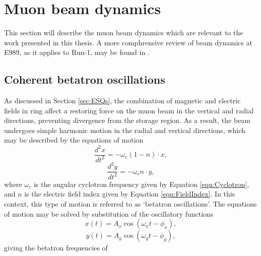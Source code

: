 \section{Muon beam dynamics}\label{sec:BeamDynamics}

This section will describe the muon beam dynamics which are relevant to the work presented in this thesis. A more comphrensive review of beam dynamics at E989, as it applies to Run-1, may be found in \cite{BeamDynamics}.

\subsection{Coherent betatron oscillations}\label{subsec:CBO}

As discussed in Section \ref{sec:ESQs}, the combination of magnetic and electric fields in ring affect a restoring force on the muon beam in the vertical and radial directions, preventing divergence from the storage region. As a result, the beam undergoes simple harmonic motion in the radial and vertical directions, which may be described by the equations of motion 
%
\begin{equation}
  \frac{d^{2}x}{dt^{2}} = -\omega_{c}(1-n)\cdot x,
  \label{eqn:EOM_BOx}
\end{equation}
%
%
\begin{equation}
  \frac{d^{2}y}{dt^{2}} = -\omega_{c}n\cdot y,
  \label{eqn:EOM_BOy}
\end{equation}
%
where $\omega_{c}$ is the angular cyclotron frequency given by Equation \ref{eqn:Cyclotron}, and $n$ is the electric field index given by Equation \ref{eqn:FieldIndex}. In this context, this type of motion is referred to as `betatron oscillations'. The equations of motion may be solved by substitution of the oscillatory functions
%
\begin{equation}
  x(t) = A_{x}\cos(\omega_{x}t-\phi_{x}),
  \label{eqn:SLN_BOx}
\end{equation}
%
\begin{equation}
  y(t) = A_{y}\cos(\omega_{y}t-\phi_{y}),
  \label{eqn:SLN_BOy}
\end{equation}
%
giving the betatron frequencies of  


